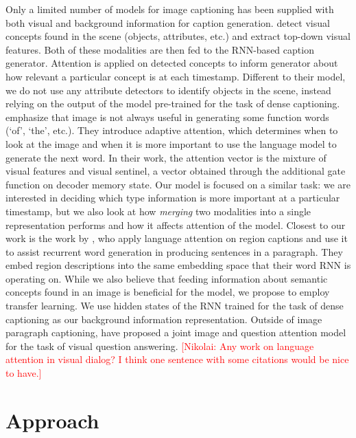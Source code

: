 \documentclass[11pt,a4paper]{article}
\newcommand{\kibitz}[2]{\ifnum\Comments=1\textcolor{#1}{#2}\fi}
\newcommand{\nikolai}[1]{\kibitz{red}      {[Nikolai: #1]}}
\begin{document}
Only a limited number of models for image captioning has been supplied with both visual and background information for caption generation.
 detect visual concepts found in the scene (objects, attributes, etc.) and extract top-down visual features.
Both of these modalities are then fed to the RNN-based caption generator.
Attention is applied on detected concepts to inform generator about how relevant a particular concept is at each timestamp. Different to their model, we do not use any attribute detectors to identify objects in the scene, instead relying on the output of the model pre-trained for the task of dense captioning.
 emphasize that image is not always useful in generating some function words (`of', `the', etc.).
They introduce adaptive attention, which determines when to look at the image and when it is more important to use the language model to generate the next word.
In their work, the attention vector is the mixture of visual features and visual sentinel, a vector obtained through the additional gate function on decoder memory state.
Our model is focused on a similar task: we are interested in deciding which type information is more important at a particular timestamp, but we also look at how \textit{merging} two modalities into a single representation performs and how it affects attention of the model.
Closest to our work is the work by \cite{liang2017recurrent}, who apply language attention on region captions and use it to assist recurrent word generation in producing sentences in a paragraph. They embed region descriptions into the same embedding space that their word RNN is operating on. %
While we also believe that feeding information about semantic concepts found in an image is beneficial for the model, we propose to employ transfer learning. We use hidden states of the RNN trained for the task of dense captioning \cite{densecap} as our background information representation.
Outside of image paragraph captioning,  have proposed a joint image and question attention model for the task of visual question answering.
\nikolai{Any work on language attention in visual dialog? I think one sentence with some citations would be nice to have.}


\section{Approach}
\end{document}
